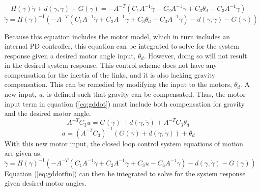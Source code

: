 \[
H(\gamma) \ddot{\gamma}+d(\gamma, \dot{\gamma})+G(\gamma)=-A^{-T}\left(C_1A^{-1} \ddot{\gamma}+C_2 A^{-1} \dot{\gamma}+C_3 \theta_{d}- C_3A^{-1} \gamma\right)
\]
\begin{equation}
\ddot{\gamma}=H(\gamma)^{-1}\left(-A^{-T}\left(C_1 A^{-1} \ddot{\gamma}+C_2 A^{-1} \dot{\gamma}+C_3 \theta_{d}-C_3A^{-1} \gamma\right)-d(\gamma, \dot{\gamma})-G(\gamma)\right)
\label{eq:gddot}
\end{equation}

Because this equation includes the motor model, which in turn includes an internal PD controller, this equation can be integrated to solve for the system response given a desired motor angle input, $\theta_d$. However, doing so will not result in the desired system response. This control scheme does not have any compensation for the inertia of the links, and it is also lacking gravity compensation. This can be remedied by modifying the input to the motors, $\theta_d$. A new input, $u$, is defined such that gravity can be compensated. Thus, the motor input term in equation (\ref{eq:gddot}) must include both compensation for gravity and the desired motor angle.
\[
A^{-T} C_3  u=G(\gamma)+d(\gamma, \dot{\gamma})+A^{-T} C_3\theta_{d}
\]
\begin{equation}
u=\left(A^{-T} C_3\right)^{-1} \left(G(\gamma)+d(\gamma, \dot{\gamma})\right) + \theta_{d}
\end{equation}
With this new motor input, the closed loop control system equations of motion are given as:
\begin{equation}
\ddot{\gamma}=H(\gamma)^{-1}\left(-A^{-T}\left(C_1 A^{-1} \ddot{\gamma}+C_2 A^{-1} \dot{\gamma}+C_3 u-C_3A^{-1} \gamma\right)-d(\gamma, \dot{\gamma})-G(\gamma)\right)
\label{eq:gddotfin}
\end{equation}
Equation (\ref{eq:gddotfin}) can then be integrated to solve for the system response given desired motor angles.

